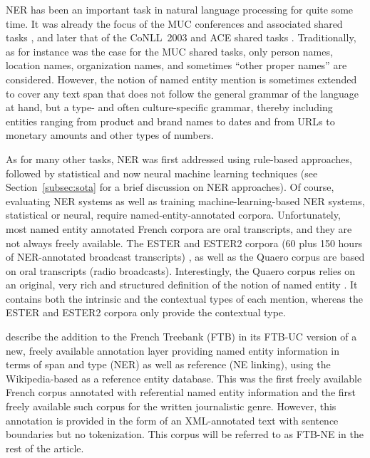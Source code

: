 NER has been an important task in natural language processing for quite some time. It was already the focus of the MUC conferences and associated shared tasks
\cite{marsh-perzanowski-1998-muc}, and later that of the CoNLL~2003 and ACE shared tasks \cite{tjong-kim-sang-de-meulder-2003-introduction,doddington-etal-2004-automatic}. Traditionally, as for instance was the case for the MUC shared tasks, only person names, location names, organization names, and sometimes ``other proper names'' are considered. However, the notion of named entity mention is sometimes extended to cover any text span that does not follow the general grammar of the language at hand, but a type- and often culture-specific grammar, thereby including entities ranging from product and brand names to dates and from URLs to monetary amounts and other types of numbers.

As for many other tasks, NER was first addressed using rule-based approaches, followed by statistical and now neural machine learning techniques (see Section~\ref{subsec:sota} for a brief discussion on NER approaches). Of course, evaluating NER systems as well as training machine-learning-based NER systems, statistical or neural, require named-entity-annotated corpora.
Unfortunately, most named entity annotated French corpora are oral transcripts, and they are not always freely available. The ESTER and ESTER2 corpora (60 plus 150 hours of NER-annotated broadcast transcripts)
\cite{galliano-etal-2005-the,galliano-etal-2009-the}, as well as the Quaero
\cite{grouin-etal-2011-proposal} corpus are based on oral transcripts (radio broadcasts). Interestingly, the Quaero corpus relies on an original, very rich and structured  definition of the notion of named entity \cite{rosset-etal-2011-entites}. It contains both the intrinsic and the contextual types of each mention, whereas the ESTER and ESTER2 corpora only provide the contextual type.

 describe the addition to the French Treebank (FTB) \citep{abeille-etal-2003-building} in its FTB-UC version \citep{candito-etal-2010-statistical} of a new, freely available annotation layer providing named entity information in terms of span and type (NER) as well as reference (NE linking), using the Wikipedia-based \aleda \cite{sagot-stern-2012-aleda} as a reference entity database. This was the first freely available French corpus annotated with referential named entity information and the first freely available such corpus for the written journalistic genre. However, this annotation is provided in the form of an XML-annotated text with sentence boundaries but no tokenization. This corpus will be referred to as FTB-NE in the rest of the article.

